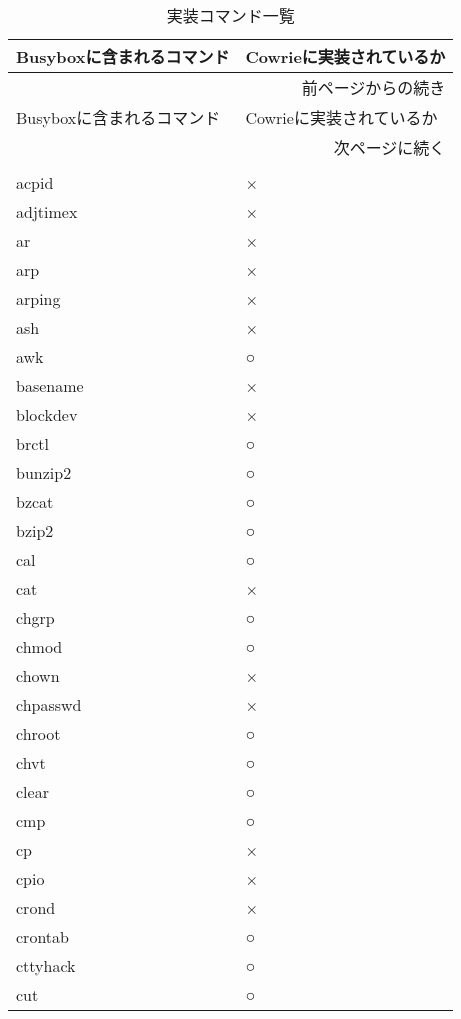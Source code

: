 \begin{longtable}{lp{50mm}}
  \caption{実装コマンド一覧}
  \label{table:command} \\
  \hline
  Busyboxに含まれるコマンド & Cowrieに実装されているか \\ \hline\hline
  \endfirsthead
  \multicolumn{3}{r}{前ページからの続き} \\ \hline
  Busyboxに含まれるコマンド & Cowrieに実装されているか \\ \hline\hline
  \endhead
  \hline
  \multicolumn{3}{r}{次ページに続く} \\
  \endfoot
  \hline
  \multicolumn{3}{r}{以上} \\
  \endlastfoot
  acpid & × \\ \hline
adjtimex & × \\ \hline
ar & × \\ \hline
arp & × \\ \hline
arping & × \\ \hline
ash & × \\ \hline
awk & ○ \\ \hline
basename & × \\ \hline
blockdev & × \\ \hline
brctl & ○ \\ \hline
bunzip2 & ○ \\ \hline
bzcat & ○ \\ \hline
bzip2 & ○ \\ \hline
cal & ○ \\ \hline
cat & × \\ \hline
chgrp & ○ \\ \hline
chmod & ○ \\ \hline
chown & × \\ \hline
chpasswd & × \\ \hline
chroot & ○ \\ \hline
chvt & ○ \\ \hline
clear & ○ \\ \hline
cmp & ○ \\ \hline
cp & × \\ \hline
cpio & × \\ \hline
crond & × \\ \hline
crontab & ○ \\ \hline
cttyhack & ○ \\ \hline
cut & ○ \\ \hline

\end{longtable}
